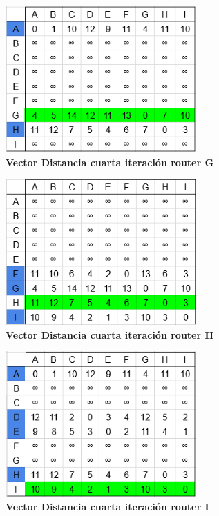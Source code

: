 \documentclass[12pt]{article}
\begin{document}
\begin{figure}[H] 
\centering 
\includegraphics[width=0.65\textwidth]{imagenes/2G4.png} \caption{\small \textbf{Vector Distancia cuarta iteración router G}}
\label{fig:diagrama_50} 
\end{figure}
\begin{figure}[H] 
\centering 
\includegraphics[width=0.65\textwidth]{imagenes/2H4.png} \caption{\small \textbf{Vector Distancia cuarta iteración router H}}
\label{fig:diagrama_51} 
\end{figure}
\begin{figure}[H] 
\centering 
\includegraphics[width=0.65\textwidth]{imagenes/2I4.png} \caption{\small \textbf{Vector Distancia cuarta iteración router I}}
\label{fig:diagrama_52} 
\end{figure}
\end{document}
